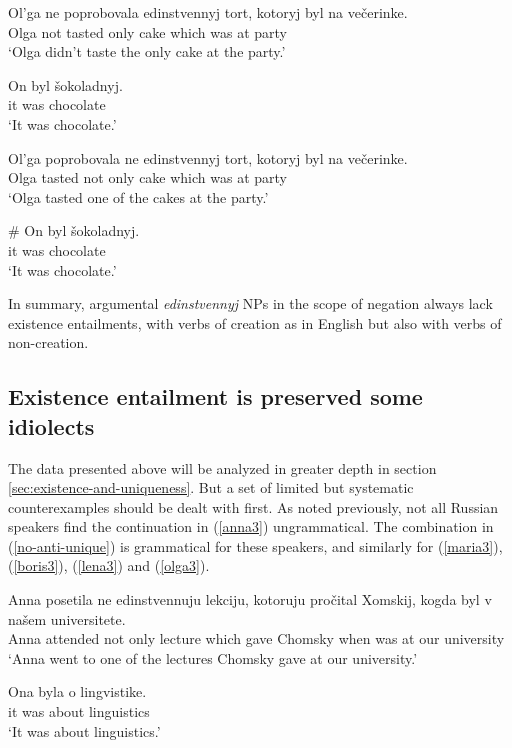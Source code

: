 \begin{exe}
	\ex \begin{xlist}
		\ex \gll Ol'ga ne poprobovala edinstvennyj tort, kotoryj byl na ve\v{c}erinke.\\
		Olga not tasted only cake which was at party\\
		\glt `Olga didn't taste the only cake at the party.'

		\ex \gll On byl \v{s}okoladnyj.\\
		it was chocolate\\
		\glt `It was chocolate.'
	\end{xlist}

	\ex \label{olga3} \begin{xlist}
		\ex \gll Ol'ga poprobovala ne edinstvennyj tort, kotoryj byl na ve\v{c}erinke.\\
		Olga tasted not only cake which was at party\\
		\glt `Olga tasted one of the cakes at the party.'

		\ex \gll \# On byl \v{s}okoladnyj.\\
		{} it was chocolate\\
		\glt `It was chocolate.'
	\end{xlist}
\end{exe}

In summary, argumental \textit{edinstvennyj} NPs in the scope of negation always lack existence entailments, with verbs of creation as in English but also with verbs of non-creation.

\subsection{Existence entailment is preserved some idiolects \label{sec:no-anti-unique}}
The data presented above will be analyzed in greater depth in section \ref{sec:existence-and-uniqueness}. But a set of limited but systematic counterexamples should be dealt with first. As noted previously, not all Russian speakers find the continuation in (\ref{anna3}) ungrammatical. The combination in (\ref{no-anti-unique}) is grammatical for these speakers, and similarly for (\ref{maria3}), (\ref{boris3}), (\ref{lena3}) and (\ref{olga3}).

\begin{exe}
	\ex \label{no-anti-unique} \begin{xlist}
		\ex \gll Anna posetila ne edinstvennuju lekciju, kotoruju pro\v{c}ital Xomskij, kogda byl v na\v{s}em universitete.\\
		Anna attended not only lecture which gave Chomsky when was at our university\\
		\glt `Anna went to one of the lectures Chomsky gave at our university.'

		\ex \gll Ona byla o lingvistike.\\
		it was about linguistics\\
		\glt `It was about linguistics.'
	\end{xlist}
\end{exe}

